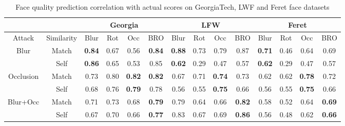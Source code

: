 \documentclass[runningheads]{llncs}
\begin{document}
\begin{table*}[t]
\centering

    \caption{Face quality prediction correlation with actual scores on GeorgiaTech, LWF and Feret face datasets}
        \begin{tabular}{c c | c c c c | c c c c | c c c c}
            \toprule
            \midrule
                \multicolumn{2}{c}{} & \multicolumn{4}{c}{Georgia} & \multicolumn{4}{c}{LFW} & \multicolumn{4}{c}{Feret}\\
                \hline
                {Attack} & Similarity & {Blur} & {Rot} & {Occ} & {BRO} & {Blur} & {Rot} & {Occ} & {BRO} & {Blur} & {Rot} & {Occ} & {BRO} \\ 
                \hline
                \multirow{2}{*}{Blur} & Match & \textbf{0.84} & 0.67 & 0.56 & \textbf{0.84} & \textbf{0.88} & 0.73 & 0.79 & 0.87 & \textbf{0.71} & 0.46 & 0.64 & 0.69\\
               & Self & \textbf{0.86} & 0.65 & 0.53 & 0.85 & \textbf{0.62} & 0.29 & 0.47 & 0.57 & \textbf{0.62} & 0.29 & 0.47 & 0.57\\
                \hline
               \multirow{2}{*}{Occlusion} & Match & 0.73 & 0.80 & \textbf{0.82} & \textbf{0.82} & 0.67 & 0.71 & \textbf{0.74} & 0.73 & 0.62 & 0.62 & \textbf{0.78} & 0.72 \\
              & Self & 0.68 & 0.76 & \textbf{0.79} & 0.78 & 0.56 & 0.55 & \textbf{0.75} & 0.66 & 0.56 & 0.55 & \textbf{0.75} & 0.66   \\
                \hline
                \multirow{2}{*}{Blur+Occ} & Match & 0.71 & 0.73 & 0.68 & \textbf{0.79} & 0.79 & 0.64 & 0.66 & \textbf{0.82} & 0.58 & 0.52 & 0.64 & \textbf{0.69}  \\
                & Self & 0.67 & 0.70 & 0.66 & \textbf{0.77} & 0.83 & 0.67 & 0.69 & \textbf{0.86} & 0.56 & 0.48 & 0.62 & \textbf{0.66}\\
            \midrule
            \bottomrule
        \end{tabular}
    \label{tab:own_Gerogia}
\centering
\end{table*}
\end{document}
